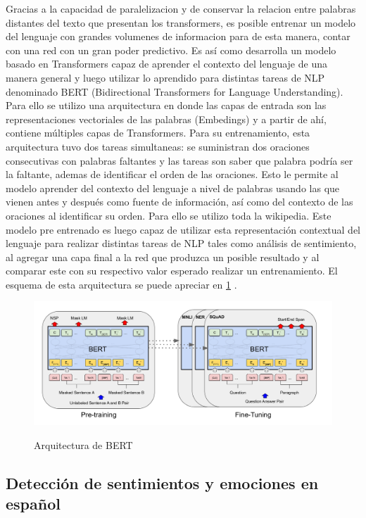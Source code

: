Gracias a la capacidad de paralelizacion y de conservar la relacion entre palabras distantes del texto que presentan los transformers, es posible entrenar un modelo del lenguaje con grandes volumenes de informacion para de esta manera, contar con una red con un gran poder predictivo. Es así como\cite{devlin2018bert}  desarrolla un modelo basado en Transformers capaz de aprender el contexto del lenguaje de una manera general y luego utilizar lo aprendido para distintas tareas de NLP denominado BERT (Bidirectional Transformers for Language Understanding). Para ello se utilizo una arquitectura en donde las capas de entrada son las representaciones vectoriales de las palabras (Embedings) y a partir de ahí, contiene múltiples capas de Transformers. Para su entrenamiento, esta arquitectura tuvo dos tareas simultaneas: se suministran dos oraciones consecutivas con palabras faltantes y las tareas son saber que palabra podría ser la faltante, ademas de identificar el orden de las oraciones. Esto le permite al modelo aprender del contexto del lenguaje a nivel de palabras usando las que vienen antes y después como fuente de información, así como del contexto de las oraciones al identificar su orden. Para ello se utilizo toda la wikipedia. Este modelo pre entrenado es luego capaz de utilizar esta representación contextual del lenguaje para realizar distintas tareas de NLP tales como análisis de sentimiento, al agregar una capa final a la red que produzca un posible resultado y al comparar este con su respectivo valor esperado realizar un entrenamiento. El esquema de esta arquitectura se puede apreciar en \ref{figure:BERT} \cite{devlin2018bert}.

\begin{figure}[h]
	\caption{Arquitectura de BERT}
	\centering
	\includegraphics[scale=0.35]{Images & Logos/BERT.png} 
	\label{figure:BERT}
\end{figure}



\subsection{Detección de sentimientos y emociones en español}

